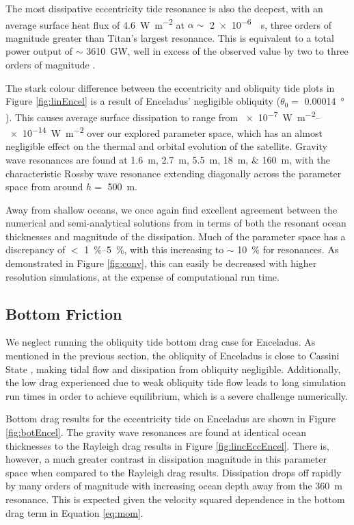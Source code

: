 The most dissipative eccentricity tide resonance is also the deepest, with an average surface heat flux of \SI{4.6}{\watt\per\square\metre} at $\alpha\sim$ \SI{2e-6}{\per\second}, three orders of magnitude greater than Titan's largest resonance. This is equivalent to a total power output of $\sim$ \SI{3610}{\giga\watt}, well in excess of the observed value by two to three orders of magnitude \citep{spencer2006cassini}. 

The stark colour difference between the eccentricity and obliquity tide plots in Figure \ref{fig:linEncel} is a result of Enceladus' negligible obliquity ($\theta_0 =$ \SI{0.00014}{\degree} \citep{chen2013tidal}). This causes average surface dissipation to range from \SIrange{e-7}{e-14}{\watt\per\square\metre} over our explored parameter space, which has an almost negligible effect on the thermal and orbital evolution of the satellite. Gravity wave resonances are found at \SIlist{1.6;2.7;5.5;18;160}{\metre}, with the characteristic Rossby wave resonance extending diagonally across the parameter space from around $h=$ \SI{500}{\metre}.

Away from shallow oceans, we once again find excellent agreement between the numerical and semi-analytical solutions from \citet{matsuyama2014tidal} in terms of both the resonant ocean thicknesses and magnitude of the dissipation. Much of the parameter space has a discrepancy of $<$ \SIrange{1}{5}{\percent}, with this increasing to $\sim$ \SI{10}{\percent} for resonances. As demonstrated in Figure \ref{fig:conv}, this can easily be decreased with higher resolution simulations, at the expense of computational run time.


\subsection{Bottom Friction}

We neglect running the obliquity tide bottom drag case for Enceladus. As mentioned in the previous section, the obliquity of Enceladus is close to Cassini State \citep{chen2011obliquity,chen2013tidal}, making tidal flow and dissipation from obliquity negligible. Additionally, the low drag experienced due to weak obliquity tide flow leads to long simulation run times in order to achieve equilibrium, which is a severe challenge numerically.

Bottom drag results for the eccentricity tide on Enceladus are shown in Figure \ref{fig:botEncel}. The gravity wave resonances are found at identical ocean thicknesses to the Rayleigh drag results in Figure \ref{fig:lincEccEncel}. There is, however, a much greater contrast in dissipation magnitude in this parameter space when compared to the Rayleigh drag results. Dissipation drops off rapidly by many orders of magnitude with increasing ocean depth away from the \SI{360}{\metre} resonance. This is expected given the velocity squared dependence in the bottom drag term in Equation \ref{eq:mom}. 

